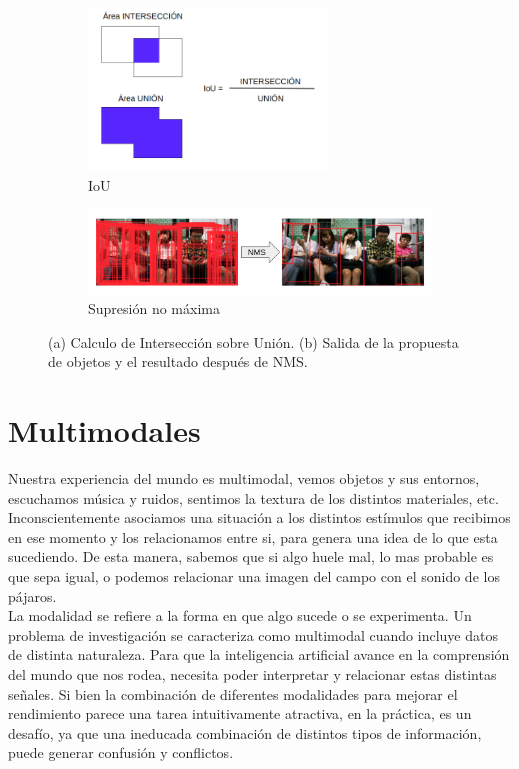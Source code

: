 \begin{figure}[]
	\begin{subfigure}{.5\textwidth}
		\centering
		\includegraphics[width=0.7\textwidth]{img/iou.png}
		\caption{IoU}
		\label{fig:IoU}
	\end{subfigure}
	\begin{subfigure}{.5\textwidth}
		\centering
		\includegraphics[width=1.1\textwidth]{img/NMS.png}
		\caption{Supresión no máxima}
		\label{fig:NMS}
	\end{subfigure}
	\caption{(a) Calculo de Intersección sobre Unión. (b) Salida de la propuesta de objetos y el resultado después de NMS.}
		\label{fig:RP}
\end{figure}

\section{Multimodales} \label{sec:multimodales}

Nuestra experiencia del mundo es multimodal, vemos objetos y sus entornos, escuchamos música y ruidos, sentimos la textura de los distintos materiales, etc.  Inconscientemente asociamos una situación a los distintos estímulos que recibimos en ese momento y los relacionamos entre si, para genera una idea de lo que esta sucediendo. De esta manera, sabemos que si algo huele mal, lo mas probable es que sepa igual, o podemos relacionar una imagen del campo con el sonido de los pájaros.\\

La modalidad se refiere a la forma en que algo sucede o se experimenta. Un problema de investigación se caracteriza como multimodal cuando incluye datos de distinta naturaleza. Para que la inteligencia artificial avance en la comprensión del mundo que nos rodea, necesita poder interpretar y relacionar estas distintas señales. Si bien la combinación de diferentes modalidades para mejorar el rendimiento parece una tarea intuitivamente atractiva, en la práctica, es un desafío, ya que una ineducada combinación de distintos tipos de información, puede generar confusión y conflictos. 

